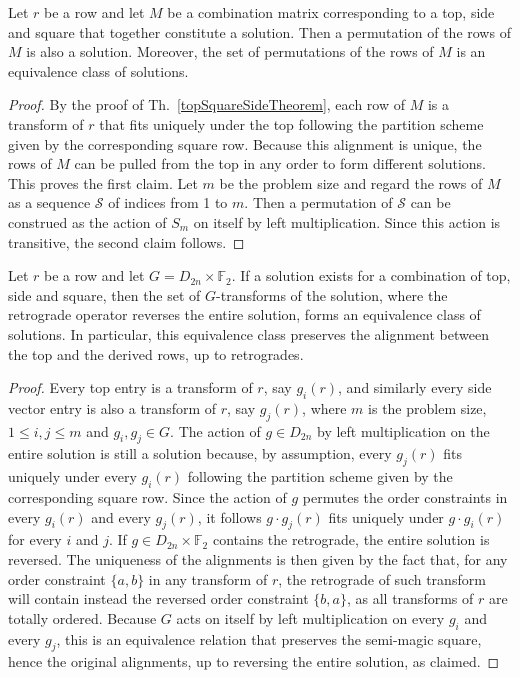\begin{corollary}
	\label{topSquareSideCorollary}
	Let $r$ be a row and let $M$ be a combination matrix corresponding to a top, side and square that together constitute a solution. Then a permutation of the rows of $M$ is also a solution. Moreover, the set of permutations of the rows of $M$ is an equivalence class of solutions.
	\begin{proof}
	By the proof of Th.~\ref{topSquareSideTheorem}, each row of $M$ is a transform of $r$ that fits uniquely under the top following the partition scheme given by the corresponding square row. Because this alignment is unique, the rows of $M$ can be pulled from the top in any order to form different solutions. This proves the first claim. Let $m$ be the problem size and regard the rows of $M$ as a sequence $\mathcal{S}$ of indices from 1 to $m$. Then a permutation of $\mathcal{S}$ can be construed as the action of $S_m$ on itself by left multiplication. Since this action is transitive, the second claim follows.
	\end{proof}
\end{corollary}

\begin{corollary}
	\label{topSquareSideOrbit}
	Let $r$ be a row and let $G = D_{2n} \times \mathbb{F}_2$. If a solution exists for a combination of top, side and square, then the set of $G$-transforms of the solution, where the retrograde operator reverses the entire solution, forms an equivalence class of solutions. In particular, this equivalence class preserves the alignment between the top and the derived rows, up to retrogrades.
    \begin{proof}
    Every top entry is a transform of $r$, say $g_i(r)$, and similarly every side vector entry is also a transform of $r$, say $g_j(r)$, where $m$ is the problem size, $1 \le i, j \le m$ and $g_i, g_j \in G$. The action of $g \in D_{2n}$ by left multiplication on the entire solution is still a solution because, by assumption, every $g_j(r)$ fits uniquely under every $g_i(r)$ following the partition scheme given by the corresponding square row. Since the action of $g$ permutes the order constraints in every $g_i(r)$ and every $g_j(r)$, it follows $g \cdot g_j(r)$ fits uniquely under $g \cdot g_i(r)$ for every $i$ and $j$. If $g \in D_{2n} \times \mathbb{F}_2$ contains the retrograde, the entire solution is reversed. The uniqueness of the alignments is then given by the fact that, for any order constraint $\{a, b\}$ in any transform of $r$, the retrograde of such transform will contain instead the reversed order constraint $\{b, a\}$, as all transforms of $r$ are totally ordered. Because $G$ acts on itself by left multiplication on every $g_i$ and every $g_j$, this is an equivalence relation that preserves the semi-magic square, hence the original alignments, up to reversing the entire solution, as claimed.
    \end{proof}
\end{corollary}

